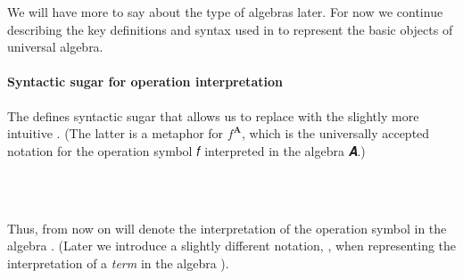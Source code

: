 \documentclass[a4paper,UKenglish,cleveref, autoref, thm-restate]{lipics-v2019}
\begin{document}
We will have more to say about the type of algebras later.  For now we continue describing the key definitions and syntax used in \agdaualib to represent the basic objects of universal algebra.

\paragraph*{Syntactic sugar for operation interpretation}
The \agdaualib defines syntactic sugar that allows us to replace \AgdaSpace{}\AgdaSpace{}\AgdaSpace{}\AgdaSpace{} with the slightly more intuitive \AgdaSpace{}\AgdaSpace{}. (The latter is a metaphor for \(f^\mathbf{A}\), which is the universally accepted notation for the operation symbol 𝑓 interpreted in the algebra 𝑨.)
\begin{code}%
\>[0][@{}l@{\AgdaIndent{0}}]%
\>[1]\AgdaSpace{}%
\AgdaSymbol{:}\AgdaSpace{}%
\AgdaSymbol{(}\AgdaSpace{}%
\AgdaSymbol{:}\AgdaSpace{}%
\AgdaSpace{}%
\AgdaSpace{}%
\AgdaSymbol{)}\AgdaSpace{}%
\AgdaSpace{}%
\AgdaSymbol{(}\AgdaSpace{}%
\AgdaSymbol{:}\AgdaSpace{}%
\AgdaSpace{}%
\AgdaSpace{}%
\AgdaSymbol{)}\AgdaSpace{}%
%
\AgdaSymbol{(}\AgdaSpace{}%
\AgdaSpace{}%
\AgdaSpace{}%
\AgdaSpace{}%
\AgdaSpace{}%
\AgdaSpace{}%
\AgdaSpace{}%
\AgdaSymbol{)}\AgdaSpace{}%
\AgdaSpace{}%
\AgdaSpace{}%
\AgdaSpace{}%
\<%
\\
%
\\[\AgdaEmptyExtraSkip]%
\>[1]\AgdaSpace{}%
\AgdaSpace{}%
\AgdaSpace{}%
\AgdaSymbol{=}\AgdaSpace{}%
\AgdaSpace{}%
\AgdaSpace{}%
\AgdaSpace{}%
\AgdaSymbol{(}\AgdaSpace{}%
\AgdaSpace{}%
\AgdaSpace{}%
\AgdaSymbol{)}\AgdaSpace{}%
\<%
\end{code}
Thus, from now on \AgdaSpace{}\AgdaSpace{}\AgdaSpace{} will denote the interpretation of the operation symbol  in the algebra .  (Later we introduce a slightly different notation, \AgdaSpace{}\AgdaSpace{}, when representing the interpretation of a \emph{term}  in the algebra ).
\end{document}
